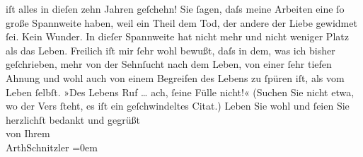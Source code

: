                iſt alles in dieſen zehn Jahren geſchehn! Sie ſagen, daſs meine Arbeiten eine ſo
               große Spannweite haben, weil ein Theil dem Tod, der andere der Liebe gewidmet {\pb}ſei. Kein Wunder. In dieſer Spannweite hat nicht
               mehr und nicht weniger Platz als das Leben. Freilich iſt mir ſehr wohl bewußt, daſs
               in dem, was ich bisher geſchrieben, mehr von der Sehnſucht nach dem Leben, von einer
               ſehr tiefen Ahnung und wohl auch von einem Begreifen des Lebens zu ſpüren iſt, als
               vom Leben ſelbſt. »Des Lebens Ruf {\dots} ach, ſeine Fülle
               nicht!« (Suchen Sie nicht etwa, wo der Vers {\pb}ſteht, es iſt ein geſchwindeltes Citat.)\pend
           \pstart
           Leben Sie wohl und ſeien Sie herzlichſt bedankt und gegrüßt{\\[\baselineskip]}von Ihrem{\\[\baselineskip]}\spacefill\mbox{ArthSchnitzler}\pend
           \leftskip=0em{}\endnumbering{}  
      